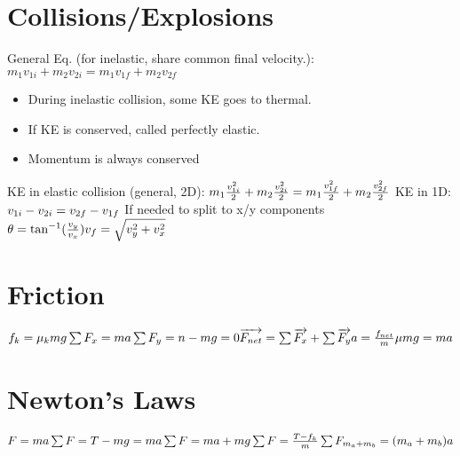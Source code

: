 \documentclass[11pt]{article}
\begin{document}
\begin{paracol}{3}
        \section*{Collisions/Explosions}
        \begin{fleqn}
            General Eq. (for inelastic, share common final velocity.): \newline
            $
            m_1 v_{1i} + m_2 v_{2i} = m_1 v_{1f} + m_2 v_{2f}
            $
            \begin{itemize}
                \item During inelastic collision, some KE goes to thermal.
                \item If KE is conserved, called perfectly elastic.
                \item Momentum is always conserved
            \end{itemize}
            KE in elastic collision (general, 2D): \newline
            $
            m_1 \frac{v_{1i}^2}{2} + m_2 \frac{v_{2i}^2}{2} = m_1 \frac{v_{1f}^2}{2} + m_2 \frac{v_{2f}^2}{2} \newline
            $
            KE in 1D:
            $
            v_{1i} - v_{2i} = v_{2f} - v_{1f} \newline
            $
            If needed to split to x/y components
            $
            \theta = \tan^{-1}(\frac{v_y}{v_x}) \newline
            v_f = \sqrt{v_y^2 + v_x^2} \newline
            $
        \end{fleqn}
        \section*{Friction}
        \begin{fleqn}
            $
            f_k = \mu_{k}mg \newline
            \sum F_x = ma \newline
            \sum F_y = n-mg = 0 \newline
            \overrightarrow{F_{net}} = \sum \overrightarrow{F_x}+\sum \overrightarrow{F_y} \newline
            a=\frac{f_{net}}{m} \newline
            \mu mg = ma \newline
            $
        \end{fleqn}
        \section*{Newton's Laws}
        \begin{fleqn}
            $
            F=ma \newline
            \sum F = T - mg = ma \newline
            \sum F = ma + mg \newline
            \sum F = \frac{T-f_k}{m} \newline
            \sum F_{m_a+m_b} = (m_a+m_b)a \newline
            $
        \end{fleqn}
    \end{paracol}
\end{document}
